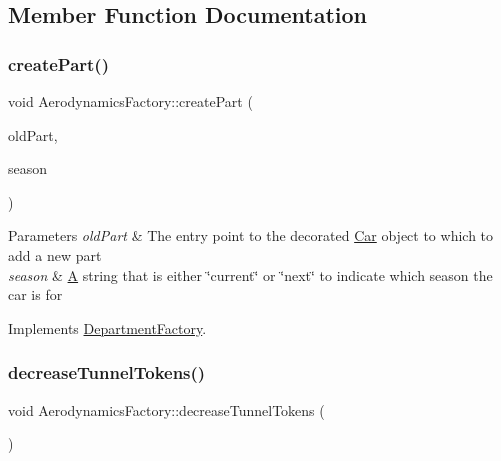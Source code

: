 \subsection{Member Function Documentation}
\mbox{\label{classAerodynamicsFactory_a2c6e6ce04d21da014e3c0c6affe423ae}} 
\subsubsection{\texorpdfstring{create\+Part()}{createPart()}}
{\footnotesize\ttfamily void Aerodynamics\+Factory\+::create\+Part (\begin{DoxyParamCaption}\item[{\hyperlink{classDepartmentOutput}{Department\+Output} $\ast$}]{old\+Part,  }\item[{string}]{season }\end{DoxyParamCaption})\hspace{0.3cm}{\ttfamily [virtual]}}


\begin{DoxyParams}{Parameters}
{\em old\+Part} & The entry point to the decorated \hyperlink{classCar}{Car} object to which to add a new part \\
\hline
{\em season} & \hyperlink{classA}{A} string that is either \char`\"{}current\char`\"{} or \char`\"{}next\char`\"{} to indicate which season the car is for \\
\hline
\end{DoxyParams}


Implements \hyperlink{classDepartmentFactory_a6080a560efb9fe0b9c870db5a7358886}{Department\+Factory}.

\mbox{\label{classAerodynamicsFactory_a244210a6b33080c3426d486d09187717}} 
\subsubsection{\texorpdfstring{decrease\+Tunnel\+Tokens()}{decreaseTunnelTokens()}}
{\footnotesize\ttfamily void Aerodynamics\+Factory\+::decrease\+Tunnel\+Tokens (\begin{DoxyParamCaption}{ }\end{DoxyParamCaption})}

